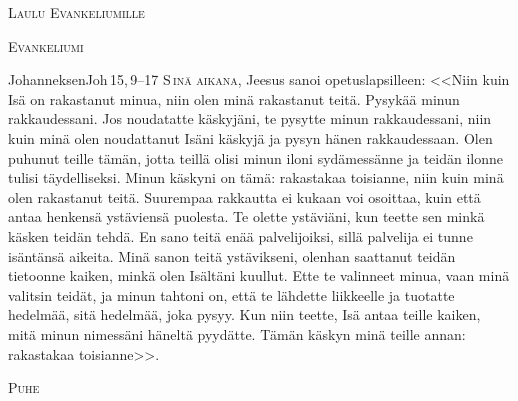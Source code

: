 \documentclass[11pt,a4paper]{book}
\renewcommand{\intestfont}[1]{{\Large\scshape\textcolor{SAGEcolor}{#1}}} %
\newcommand{\sottomomento}[1]{{\intestfont{#1}}\par\medskip}
\begin{document}
\begin{pages}
\begin{Rightside}
\begin{verse}
        \end{verse}
  \pend 
  \pstart 
  \vspace{0.5in}
        \sottomomento{\textcolor{SAGEcolor}{Laulu Evankeliumille}}
  \pend 
  \pstart 
  \vspace{0.2in}
        \alleluiaFIN
  \pend 
  \pstart 
  \vspace{0.5in}
        \sottomomento{Evankeliumi}
  \pend 
  \pstart 
  \vspace{0.2in}
        \begin{vangeloFIN}{Johanneksen}{Joh\,15,\,9--17}
        \lettrine[nindent=0pt,slope=0em,lines=3]{S}{\,inä aikana}, Jeesus sanoi opetuslapsilleen:
        <<Niin kuin Isä on rakastanut minua, niin olen minä rakastanut teitä. Pysykää minun rakkaudessani. Jos noudatatte käskyjäni, te pysytte minun rakkaudessani, niin kuin minä olen noudattanut Isäni käskyjä ja pysyn hänen rakkaudessaan. Olen puhunut teille tämän, jotta teillä olisi minun iloni sydämessänne ja teidän ilonne tulisi täydelliseksi. Minun käskyni on tämä: rakastakaa toisianne, niin kuin minä olen rakastanut teitä. Suurempaa rakkautta ei kukaan voi osoittaa, kuin että antaa henkensä ystäviensä puolesta. Te olette ystäviäni, kun teette sen minkä käsken teidän tehdä. En sano teitä enää palvelijoiksi, sillä palvelija ei tunne isäntänsä aikeita. Minä sanon teitä ystävikseni, olenhan saattanut teidän tietoonne kaiken, minkä olen Isältäni kuullut. Ette te valinneet minua, vaan minä valitsin teidät, ja minun tahtoni on, että te lähdette liikkeelle ja tuotatte hedelmää, sitä hedelmää, joka pysyy. Kun niin teette, Isä antaa teille kaiken, mitä minun nimessäni häneltä pyydätte. Tämän käskyn minä teille annan: rakastakaa toisianne>>.\\
        \end{vangeloFIN}
  \pend 
  \pstart 
  \vspace{0.5in}
        \sottomomento{Puhe}
  \pend 
  \pstart 
  \vspace{0.2in}
        \omeliaFIN
  \pend 
  \endnumbering 
\end{Rightside}
\end{pages}
\end{document}
